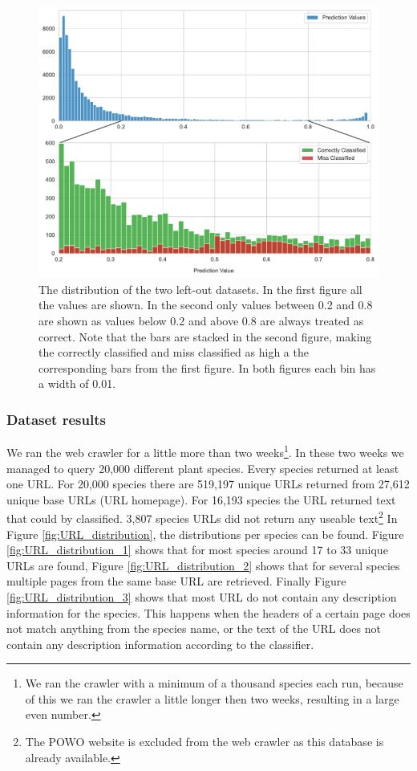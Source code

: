 \documentclass[a4paper, 12pt, oneside]{book} %
\begin{document}
\begin{figure}[h!]
 \centering
 \includegraphics[width=\textwidth]{figures/predictionvalues_external.pdf}
 \caption[Prediction values of left-out datasets]{The distribution of the two left-out datasets. In the first figure all the values are shown. In the second only values between 0.2 and 0.8 are shown as values below 0.2 and above 0.8 are always treated as correct. Note that the bars are stacked in the second figure, making the correctly classified and miss classified as high a the corresponding bars from the first figure. In both figures each bin has a width of 0.01.}
 \label{fig:predictionvalues_external}
\end{figure}

\subsubsection{Dataset results}
We ran the web crawler for a little more than two weeks\footnote{We ran the crawler with a minimum of a thousand species each run, because of this we ran the crawler a little longer then two weeks, resulting in a large even number.}.
In these two weeks we managed to query 20,000 different plant species.
Every species returned at least one URL.
For 20,000 species there are 519,197 unique URLs returned from 27,612 unique base URLs (URL homepage).
For 16,193 species the URL returned text that could by classified.
3,807 species URLs did not return any useable text\footnote{The POWO website is excluded from the web crawler as this database is already available.}
In Figure \ref{fig:URL_distribution}, the distributions per species can be found.
Figure \ref{fig:URL_distribution_1} shows that for most species around 17 to 33 unique URLs are found, Figure \ref{fig:URL_distribution_2} shows that for several species multiple pages from the same base URL are retrieved.
Finally Figure \ref{fig:URL_distribution_3} shows that most URL do not contain any description information for the species.
This happens when the headers of a certain page does not match anything from the species name, or the text of the URL does not contain any description information according to the classifier.
\end{document}
